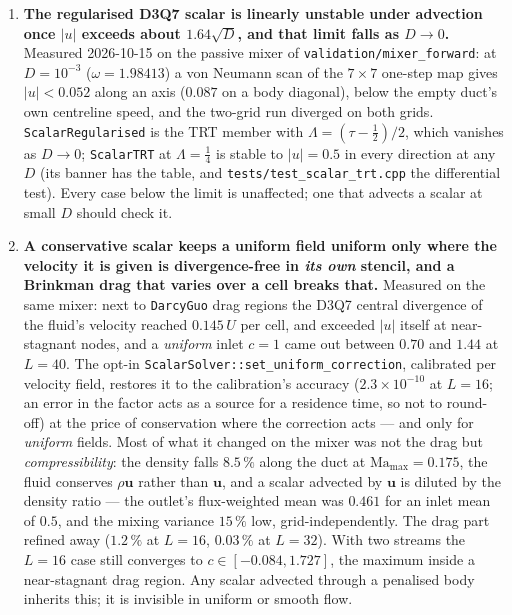 \documentclass[11pt,a4paper]{article}
\newcommand{\code}[1]{\texttt{\small #1}}
\begin{document}
\begin{enumerate}[leftmargin=1.4em,itemsep=4pt]
\item \textbf{The regularised D3Q7 scalar is linearly unstable under advection
  once $|u|$ exceeds about $1.64\sqrt{D}$, and that limit falls as $D\to0$.}
  Measured 2026-10-15 on the passive mixer of \code{validation/mixer\_forward}:
  at $D=10^{-3}$ ($\omega=1.98413$) a von Neumann scan of the $7\times7$ one-step
  map gives $|u|<0.052$ along an axis ($0.087$ on a body diagonal), below the
  empty duct's own centreline speed, and the two-grid run diverged on both grids.
  \code{ScalarRegularised} is the TRT member with $\Lambda=(\tau-\tfrac12)/2$,
  which vanishes as $D\to0$; \code{ScalarTRT} at $\Lambda=\tfrac14$ is stable to
  $|u|=0.5$ in every direction at any $D$ (its banner has the table, and
  \code{tests/test\_scalar\_trt.cpp} the differential test). Every case below the
  limit is unaffected; one that advects a scalar at small $D$ should check it.
\item \textbf{A conservative scalar keeps a uniform field uniform only where the
  velocity it is given is divergence-free in \emph{its own} stencil, and a
  Brinkman drag that varies over a cell breaks that.} Measured on the same mixer:
  next to \code{DarcyGuo} drag regions the D3Q7 central divergence of the fluid's
  velocity reached $0.145\,U$ per cell, and exceeded $|u|$ itself at
  near-stagnant nodes, and a \emph{uniform} inlet $c=1$ came out between $0.70$
  and $1.44$ at $L=40$. The opt-in \code{ScalarSolver::set\_uniform\_correction},
  calibrated per velocity field, restores it to the calibration's accuracy
  ($2.3\times10^{-10}$ at $L=16$; an error in the factor acts as a source for a
  residence time, so not to round-off) at the price of conservation where the
  correction acts --- and only for \emph{uniform} fields. Most of what it changed
  on the mixer was not the drag but \emph{compressibility}: the density falls
  $8.5\,\%$ along the duct at $\mathrm{Ma}_{\max}=0.175$, the fluid conserves
  $\rho\bm{u}$ rather than $\bm{u}$, and a scalar advected by $\bm{u}$ is diluted
  by the density ratio --- the outlet's flux-weighted mean was $0.461$ for an
  inlet mean of $0.5$, and the mixing variance $15\,\%$ low, grid-independently.
  The drag part refined away ($1.2\,\%$ at $L=16$, $0.03\,\%$ at $L=32$). With two
  streams the $L=16$ case still converges to $c\in[-0.084,1.727]$, the maximum
  inside a near-stagnant drag region. Any scalar advected through a penalised
  body inherits this; it is invisible in uniform or smooth flow.

\end{enumerate}
\end{document}
